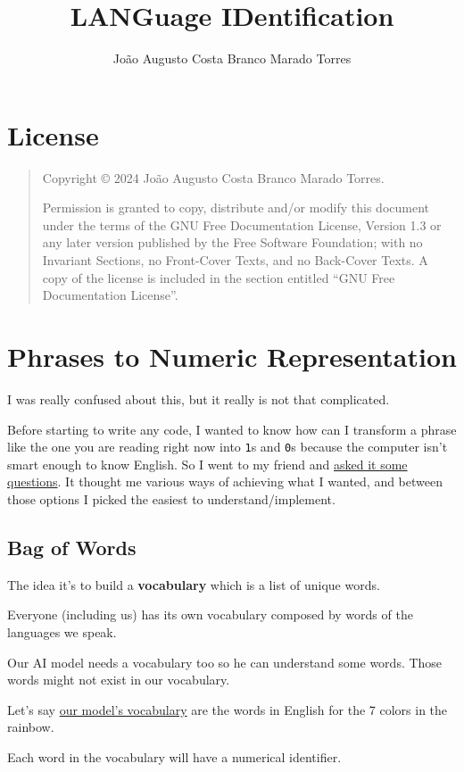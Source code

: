 \documentclass[a4paper,12pt]{article}
\title{LANGuage IDentification}
\author{João Augusto Costa Branco Marado Torres}
\newcommand{\copyrightnotice}{
    Copyright \copyright{}  2024  João Augusto Costa Branco Marado Torres.
}
\newcommand{\licensenotice}{
    \copyrightnotice
    Permission is granted to copy, distribute and/or modify this document
    under the terms of the GNU Free Documentation License, Version 1.3
    or any later version published by the Free Software Foundation;
    with no Invariant Sections, no Front-Cover Texts, and no Back-Cover Texts.
    A copy of the license is included in the section entitled ``GNU
    Free Documentation License''.
}
\theoremstyle{mytheoremstyle}
\theoremstyle{mytheoremstyle}
\theoremstyle{myproblemstyle}
\begin{document}
    \maketitle

    \section*{License}
    \bigskip
    \begin{quote}
        \licensenotice
    \end{quote}
    \bigskip

    \tableofcontents



    \section{Phrases to Numeric Representation}

    I was really confused about this, but it really is not that complicated.

    Before starting to write any code, I wanted to know how can I transform a
    phrase like the one you are reading right now into \texttt{1}s and
    \texttt{0}s because the computer isn't smart enough to know English.
    So I went to my friend and
    \href{https://chatgpt.com/share/675976d6-b2c8-8002-964c-a3fff698bcc0}{asked
    it some questions}.
    It thought me various ways of achieving what I wanted, and between those
    options I picked the easiest to understand/implement.

    \subsection{Bag of Words}

    The idea it's to build a \textbf{vocabulary} which is a list of unique
    words.

    Everyone (including us) has its own vocabulary composed by words of the
    languages we speak.

    Our AI model needs a vocabulary too so he can understand some words. Those
    words might not exist in our vocabulary.

    Let's say \hyperref[tab:rainbow_model_vocab]{our model's vocabulary} are
    the words in English for the 7 colors in the rainbow.

    Each word in the vocabulary will have a numerical identifier.
\end{document}

